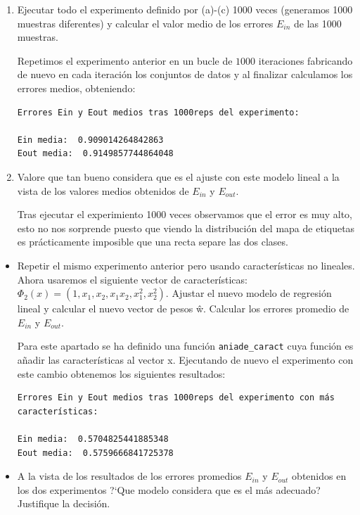 \documentclass[size=a4, parskip=half, titlepage=false, toc=flat, toc=bib, 12pt]{scrartcl}
\begin{document}
\begin{enumerate}
\begin{enumerate}
\item Ejecutar todo el experimento definido por (a)-(c) 1000 veces (generamos 1000
muestras diferentes) y calcular el valor medio de los errores $E_{in}$ de las 1000 muestras.

Repetimos el experimento anterior en un bucle de $1000$ iteraciones fabricando de nuevo en cada
iteración los conjuntos de datos y al finalizar calculamos los errores medios, obteniendo:

\begin{lstlisting}
Errores Ein y Eout medios tras 1000reps del experimento:

Ein media:  0.909014264842863
Eout media:  0.9149857744864048
\end{lstlisting}

\item Valore que tan bueno considera que es el ajuste con este modelo lineal a la vista
de los valores medios obtenidos de $E_{in}$ y $E_{out}$.

Tras ejecutar el experimiento 1000 veces observamos que el error es muy alto, esto no nos
sorprende puesto que viendo la distribución del mapa de etiquetas es prácticamente imposible
que una recta separe las dos clases.

\end{enumerate}
\begin{itemize}
\item Repetir el mismo experimento anterior pero usando características no lineales. Ahora
usaremos el siguiente vector de características: $\Phi_2 (x) = (1, x_1 , x_2 , x_1 x_2 , x^2_1 , x_2^2 )$. Ajustar
el nuevo modelo de regresión lineal y calcular el nuevo vector de pesos ŵ. Calcular
los errores promedio de $E_{in}$ y $E _{out}$.

Para este apartado se ha definido una función \verb|aniade_caract| cuya función es añadir
las características al vector x. Ejecutando de nuevo el experimento con este cambio obtenemos
los siguientes resultados:

\begin{lstlisting}
Errores Ein y Eout medios tras 1000reps del experimento con más características:

Ein media:  0.5704825441885348
Eout media:  0.5759666841725378
\end{lstlisting}

\item A la vista de los resultados de los errores promedios $E_{in}$ y $E_{out}$ obtenidos en los dos
experimentos ?`Que modelo considera que es el más adecuado? Justifique la decisión.


\end{itemize}
\end{enumerate}
\end{document}
